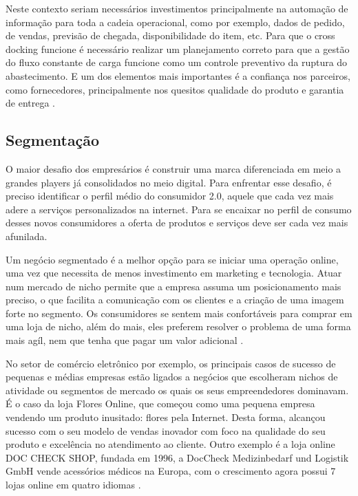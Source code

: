 Neste contexto seriam necessários investimentos principalmente na automação de informação para toda a cadeia operacional, como por exemplo, dados de pedido, de vendas, previsão de chegada, disponibilidade do item, etc. Para que o cross docking funcione é necessário realizar um planejamento correto para que a gestão do fluxo constante de carga funcione como um controle preventivo da ruptura do abastecimento. E um dos elementos mais importantes é a confiança nos parceiros, como fornecedores, principalmente nos quesitos qualidade do produto e garantia de entrega \cite{sebraecross}.

\subsection{Segmentação}
\label{subsec:framing}

O maior desafio dos empresários é construir uma marca diferenciada em meio a grandes players já consolidados no meio digital. Para enfrentar esse desafio, é preciso identificar o perfil médio do consumidor 2.0, aquele que cada vez mais adere a serviços personalizados na internet. Para se encaixar no perfil de consumo desses novos consumidores a oferta de produtos e serviços deve ser cada vez mais afunilada. 

Um negócio segmentado é a melhor opção para se iniciar uma operação online, uma vez que necessita de menos investimento em marketing e tecnologia. Atuar num mercado de nicho permite que a empresa assuma um posicionamento mais preciso, o que facilita a comunicação com os clientes e a criação de uma imagem forte no segmento. Os consumidores se sentem mais confortáveis para comprar em uma loja de nicho, além do mais, eles preferem resolver o problema de uma forma mais agíl, nem que tenha que pagar um valor adicional \cite{nichoNV}.

No setor de comércio eletrônico por exemplo, os principais casos de sucesso de pequenas e médias empresas estão ligados a negócios que escolheram nichos de atividade ou segmentos de mercado os quais os seus empreendedores dominavam. É o caso da loja Flores Online, que começou como uma pequena empresa vendendo um produto inusitado: flores pela Internet. Desta forma, alcançou sucesso com o seu modelo de vendas inovador com foco na qualidade do seu produto e excelência no atendimento ao cliente. Outro exemplo é a loja online DOC CHECK SHOP, fundada em 1996, a DocCheck Medizinbedarf und Logistik GmbH vende acessórios médicos na Europa, com o crescimento agora possui 7 lojas online em quatro idiomas \cite{nichobraeur}.

